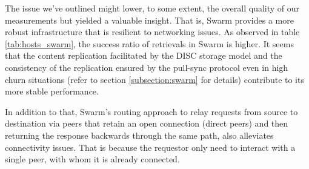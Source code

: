 The issue we've outlined might lower, to some extent, the overall quality of our measurements but yielded a valuable insight. That is, Swarm provides a more robust infrastructure that is resilient to networking issues. As observed in table \ref{tab:hosts_swarm}, the success ratio of retrievals in Swarm is higher. It seems that the content replication facilitated by the DISC storage model and  the consistency of the replication ensured by the pull-sync protocol even in high churn situations (refer to section \ref{subsection:swarm} for details) contribute to its more stable performance. 

In addition to that, Swarm's routing approach to relay requests from source to destination via peers that retain an open connection (direct peers) and then returning the response backwards through the same path, also alleviates connectivity issues. That is because the requestor only need to interact with a single peer, with whom it is already connected.




